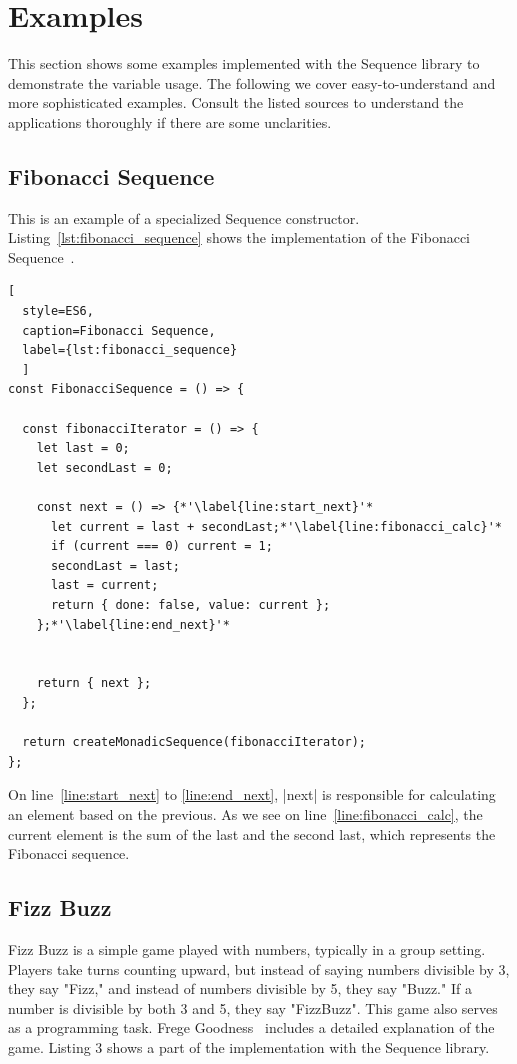 \section{Examples} %
\label{sec:Examples}This section shows some examples implemented with the
Sequence library to demonstrate the variable usage.
The following we cover easy-to-understand and more sophisticated
examples.  Consult the listed sources to understand the applications
thoroughly if there are some unclarities.

\subsection{Fibonacci Sequence}
\label{sub:Fibonacci Sequence}
This is an example of a specialized Sequence constructor.
Listing~\ref{lst:fibonacci_sequence} shows the implementation of the Fibonacci 
Sequence~\cite[p.~36]{math_diskrete_2011}. 
\begin{lstlisting}[
  style=ES6, 
  caption=Fibonacci Sequence,
  label={lst:fibonacci_sequence}
  ]
const FibonacciSequence = () => {

  const fibonacciIterator = () => {
    let last = 0;
    let secondLast = 0;

    const next = () => {*'\label{line:start_next}'*
      let current = last + secondLast;*'\label{line:fibonacci_calc}'*
      if (current === 0) current = 1;
      secondLast = last;
      last = current;
      return { done: false, value: current };
    };*'\label{line:end_next}'*


    return { next };
  };

  return createMonadicSequence(fibonacciIterator);
};
\end{lstlisting}
On line~\ref{line:start_next} to \ref{line:end_next}, |next| is responsible for calculating an
element based on the previous. As we see on line~\ref{line:fibonacci_calc}, the current element is the
sum of the last and the second last, which represents the Fibonacci sequence.

\subsection{Fizz Buzz}
\label{sub:Fizz Buzz}
Fizz Buzz is a simple game played with numbers, typically in a group setting. Players
take turns counting upward, but instead of saying numbers divisible by 3, they
say "Fizz," and instead of numbers divisible by 5, they say "Buzz." If a number
is divisible by both 3 and 5, they say "FizzBuzz". This game also serves as a 
programming task.
\newline
Frege Goodness~\cite{frege_goodness} includes a detailed explanation of the game.
Listing 3 shows a part of the implementation with the Sequence library.

